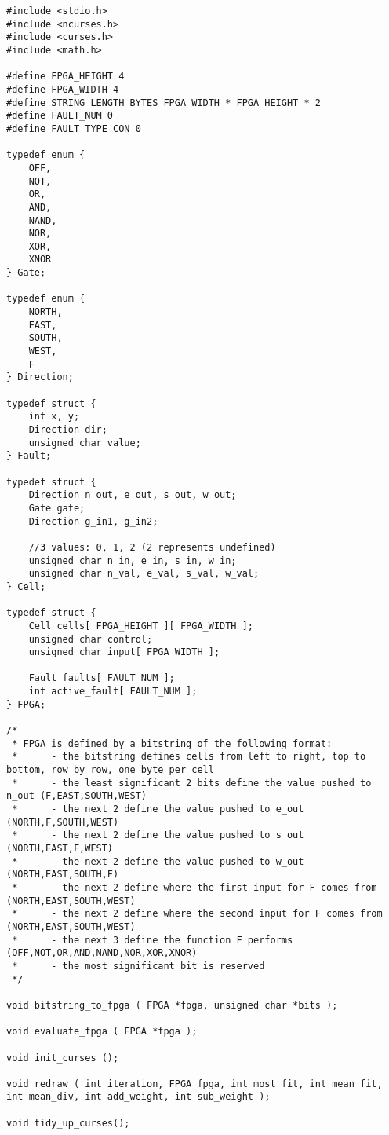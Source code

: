 \documentclass[ %
                    author={Alexander Dalton},
                supervisor={Prof. Seth Bullock},
                    degree={MEng},
                     title={Exploring Evolutionary Hardware and its Application to Dynamic Problems},
                  subtitle={},
                      type={research},
                      year={2018} ]{dissertation}
\begin{document}
\begin{lstlisting}
#include <stdio.h>
#include <ncurses.h>
#include <curses.h>
#include <math.h>

#define FPGA_HEIGHT 4
#define FPGA_WIDTH 4
#define STRING_LENGTH_BYTES FPGA_WIDTH * FPGA_HEIGHT * 2
#define FAULT_NUM 0
#define FAULT_TYPE_CON 0

typedef enum {
	OFF,
	NOT,
	OR,
	AND,
	NAND,
	NOR,
	XOR,
	XNOR
} Gate;

typedef enum {
	NORTH,
	EAST,
	SOUTH,
	WEST,
	F
} Direction;

typedef struct {
	int x, y;
	Direction dir;
	unsigned char value;
} Fault;

typedef struct {
	Direction n_out, e_out, s_out, w_out;
	Gate gate;
	Direction g_in1, g_in2;

	//3 values: 0, 1, 2 (2 represents undefined)
	unsigned char n_in, e_in, s_in, w_in;
	unsigned char n_val, e_val, s_val, w_val;
} Cell;

typedef struct {
	Cell cells[ FPGA_HEIGHT ][ FPGA_WIDTH ];
	unsigned char control;
	unsigned char input[ FPGA_WIDTH ];

	Fault faults[ FAULT_NUM ];
	int active_fault[ FAULT_NUM ];
} FPGA;

/*
 * FPGA is defined by a bitstring of the following format:
 * 		- the bitstring defines cells from left to right, top to bottom, row by row, one byte per cell
 * 		- the least significant 2 bits define the value pushed to n_out (F,EAST,SOUTH,WEST)
 * 		- the next 2 define the value pushed to e_out (NORTH,F,SOUTH,WEST)
 * 		- the next 2 define the value pushed to s_out (NORTH,EAST,F,WEST)
 * 		- the next 2 define the value pushed to w_out (NORTH,EAST,SOUTH,F)
 * 		- the next 2 define where the first input for F comes from (NORTH,EAST,SOUTH,WEST)
 * 		- the next 2 define where the second input for F comes from (NORTH,EAST,SOUTH,WEST)
 * 		- the next 3 define the function F performs (OFF,NOT,OR,AND,NAND,NOR,XOR,XNOR)
 * 		- the most significant bit is reserved
 */

void bitstring_to_fpga ( FPGA *fpga, unsigned char *bits );

void evaluate_fpga ( FPGA *fpga );

void init_curses ();

void redraw ( int iteration, FPGA fpga, int most_fit, int mean_fit, int mean_div, int add_weight, int sub_weight );

void tidy_up_curses();
\end{lstlisting}
\end{document}
